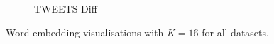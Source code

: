 \begin{figure}[!ht]
\begin{subfigure}{.16\textwidth}
  \caption{\tiny{TWEETS Diff}}
  \label{fig:tweets_diff_k16_embed_extra}
\end{subfigure}%
\vspace{1.0em}
\caption{Word embedding visualisations with $K = 16$ for all datasets.}
\label{fig:embeddings_all_16}
\end{figure}